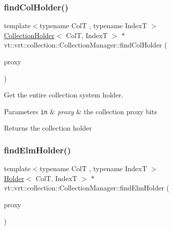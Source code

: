 \subsubsection{\texorpdfstring{find\+Col\+Holder()}{findColHolder()}}
{\footnotesize\ttfamily template$<$typename ColT , typename IndexT $>$ \\
\hyperlink{structvt_1_1vrt_1_1collection_1_1_collection_holder}{Collection\+Holder}$<$ ColT, IndexT $>$ $\ast$ vt\+::vrt\+::collection\+::\+Collection\+Manager\+::find\+Col\+Holder (\begin{DoxyParamCaption}\item[{\hyperlink{namespacevt_a1b417dd5d684f045bb58a0ede70045ac}{Virtual\+Proxy\+Type} const \&}]{proxy }\end{DoxyParamCaption})\hspace{0.3cm}{\ttfamily [private]}}



Get the entire collection system holder. 


\begin{DoxyParams}[1]{Parameters}
\mbox{\tt in}  & {\em proxy} & the collection proxy bits\\
\hline
\end{DoxyParams}
\begin{DoxyReturn}{Returns}
the collection holder 
\end{DoxyReturn}
\mbox{\label{structvt_1_1vrt_1_1collection_1_1_collection_manager_a06ff4b51fe7e15c8c4b7768cf7a1ad03}} 
\subsubsection{\texorpdfstring{find\+Elm\+Holder()}{findElmHolder()}\hspace{0.1cm}{\footnotesize\ttfamily [1/2]}}
{\footnotesize\ttfamily template$<$typename ColT , typename IndexT $>$ \\
\hyperlink{structvt_1_1vrt_1_1collection_1_1_holder}{Holder}$<$ ColT, IndexT $>$ $\ast$ vt\+::vrt\+::collection\+::\+Collection\+Manager\+::find\+Elm\+Holder (\begin{DoxyParamCaption}\item[{\hyperlink{namespacevt_a1b417dd5d684f045bb58a0ede70045ac}{Virtual\+Proxy\+Type} const \&}]{proxy }\end{DoxyParamCaption})\hspace{0.3cm}{\ttfamily [private]}}



